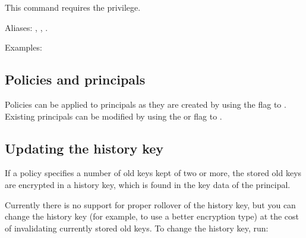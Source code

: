 \documentclass[letterpaper,10pt,english]{sphinxmanual}
\begin{document}
This command requires the  privilege.

Aliases: , , .

Examples:

%
\begin{sphinxVerbatim}[commandchars=\\\{\}]
  

   
\end{sphinxVerbatim}


\subsection{Policies and principals}
\label{\detokenize{admin/database:policies-and-principals}}
Policies can be applied to principals as they are created by using
the  flag to {\hyperref[\detokenize{admin/admin_commands/kadmin_local:add-principal}]{}}. Existing principals can
be modified by using the  or  flag to
{\hyperref[\detokenize{admin/admin_commands/kadmin_local:modify-principal}]{}}.


\subsection{Updating the history key}
\label{\detokenize{admin/database:updating-history-key}}\label{\detokenize{admin/database:updating-the-history-key}}
If a policy specifies a number of old keys kept of two or more, the
stored old keys are encrypted in a history key, which is found in the
key data of the  principal.

Currently there is no support for proper rollover of the history key,
but you can change the history key (for example, to use a better
encryption type) at the cost of invalidating currently stored old
keys.  To change the history key, run:
\end{document}
